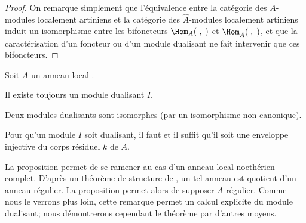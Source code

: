 \begin{proof}
On remarque simplement que l'\'equivalence entre la cat\'egorie des $A$-modules localement artiniens et la cat\'egorie des $\hat{A}$-modules localement artiniens induit un isomorphisme entre les bifoncteurs $\Hom_{A}(\;, \;)$ et $\Hom_{\hat{A}}(\;, \;)$, et que la caract\'erisation d'un foncteur ou d'un module dualisant ne fait intervenir que ces bifoncteurs.
\skipqed
\end{proof}

\begin{theoreme} \label{IV.4.7}
Soit $A$ un anneau local .
\begin{enumeratea}
\item
Il existe toujours un module dualisant $I$.

\item
Deux modules dualisants sont isomorphes (par un isomorphisme non canonique).

\item
Pour qu'un module $I$ soit dualisant, il faut et il suffit qu'il soit une enveloppe injective du corps r\'esiduel $k$ de $A$.
\end{enumeratea}
\end{theoreme}

\begin{remarque} \label{IV.4.8}
La proposition  permet de se ramener au cas d'un anneau local noeth\'erien complet. D'apr\`es un th\'eor\`eme de structure de , un tel anneau est quotient d'un anneau r\'egulier. La proposition  permet alors de supposer $A$ r\'egulier. Comme nous le verrons plus loin, cette remarque permet un calcul explicite du module dualisant; nous d\'emontrerons cependant le th\'eor\`eme  par d'autres moyens.
\end{remarque}

